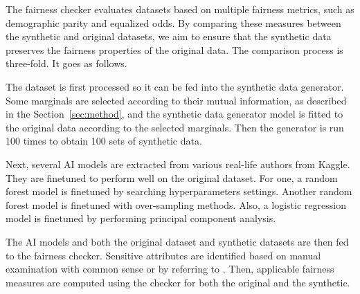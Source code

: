 \documentclass[manuscript,screen,review,anonymous]{acmart}
\begin{document}
The fairness checker evaluates datasets based on multiple fairness metrics, such as demographic parity and equalized odds. By comparing these measures between the synthetic and original datasets, we aim to ensure that the synthetic data preserves the fairness properties of the original data. The comparison process is three-fold. It goes as follows.

The dataset is first processed so it can be fed into the synthetic data generator. Some marginals are selected according to their mutual information, as described in the Section~\ref{sec:method}, and the synthetic data generator model is fitted to the original data according to the selected marginals. Then the generator is run 100 times to obtain 100 sets of synthetic data.

Next, several AI models are extracted from various real-life authors from Kaggle. They are finetuned to perform well on the original dataset. For one, a random forest model is finetuned by searching hyperparameters settings\cite{Ipbyrne2023}. Another random forest model is finetuned with over-sampling methods\cite{Jawat2024}. Also, a logistic regression model is finetuned by performing principal component analysis\cite{Prashant1112023}.

The AI models and both the original dataset and synthetic datasets are then fed to the fairness checker. Sensitive attributes are identified based on manual examination with common sense or by referring to \cite{pessach2022review}. Then, applicable fairness measures are computed using the checker for both the original and the synthetic.



\end{document}
